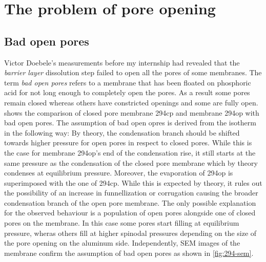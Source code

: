 \documentclass[../thesis.tex]{subfiles}
\begin{document}
  \section{The problem of pore opening}
  \label{sec:opening-problem}


      \subsection{Bad open pores}
      \label{subsec:bad-open-pores}

        

        Victor Doebele's measurements before my internship had revealed that the \textit{barrier layer} dissolution step failed to open all the pores of some membranes. The term \textit{bad open pores} refers to a membrane that has been floated on phosphoric acid for not long enough to completely open the pores. As a result some pores remain closed whereas others have constricted openings and some are fully open.  shows the comparison of closed pore membrane 294cp and membrane 294op with bad open pores. The assumption of bad open opres is derived from the isotherm in the following way: By theory, the condensation branch should be shifted towards higher pressure for open pores in respect to closed pores. While this is the case for membrane 294op's end of the condensation rise, it still starts at the same pressure as the condensation of the closed pore membrane which by theory condenses at equilibrium pressure. Moreover, the evaporation of 294op is superimposed with the one of 294cp. While this is expected by theory, it rules out the possibility of an increase in funnellization or corrugation causing the broader condensation branch of the open pore membrane. The only possible explanation for the observed behaviour is a population of open pores alongside one of closed pores on the membrane. In this case some pores start filling at equilibrium pressure, wheras others fill at higher spinodal pressures depending on the size of the pore opening on the aluminum side. Independently, SEM images of the membrane confirm the assumption of bad open pores as shown in \cref{fig:294-sem}.
\end{document}
